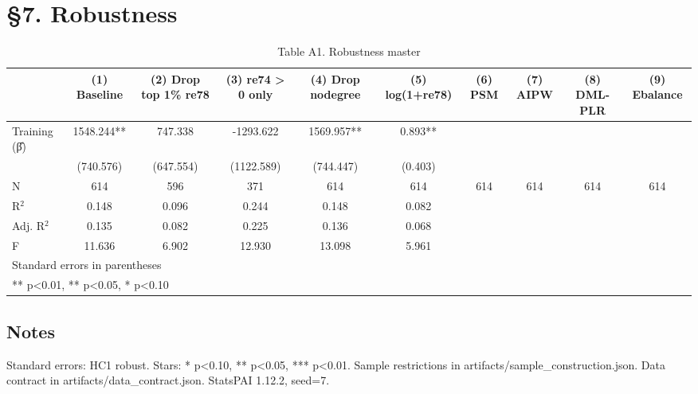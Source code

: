 \section{§7. Robustness}

\begin{table}[htbp]
\centering
\caption{Table A1. Robustness master}
\begin{tabular}{lccccccccc}
\hline\hline
 & (1) Baseline & (2) Drop top 1\% re78 & (3) re74 > 0 only & (4) Drop nodegree & (5) log(1+re78) & (6) PSM & (7) AIPW & (8) DML-PLR & (9) Ebalance \\
\hline
Training (β̂) & 1548.244** & 747.338 & -1293.622 & 1569.957** & 0.893** &  &  &  &  \\
 & (740.576) & (647.554) & (1122.589) & (744.447) & (0.403) &  &  &  &  \\
\hline
N & 614 & 596 & 371 & 614 & 614 & 614 & 614 & 614 & 614 \\
R$^2$ & 0.148 & 0.096 & 0.244 & 0.148 & 0.082 &  &  &  &  \\
Adj. R$^2$ & 0.135 & 0.082 & 0.225 & 0.136 & 0.068 &  &  &  &  \\
F & 11.636 & 6.902 & 12.930 & 13.098 & 5.961 &  &  &  &  \\
\hline\hline
\multicolumn{10}{l}{\footnotesize Standard errors in parentheses} \\
\multicolumn{10}{l}{\footnotesize *** p<0.01, ** p<0.05, * p<0.10} \\
\end{tabular}
\end{table}

\subsection*{Notes}
Standard errors: HC1 robust. Stars: * p<0.10, ** p<0.05, *** p<0.01. Sample restrictions in artifacts/sample_construction.json. Data contract in artifacts/data_contract.json. StatsPAI 1.12.2, seed=7.
